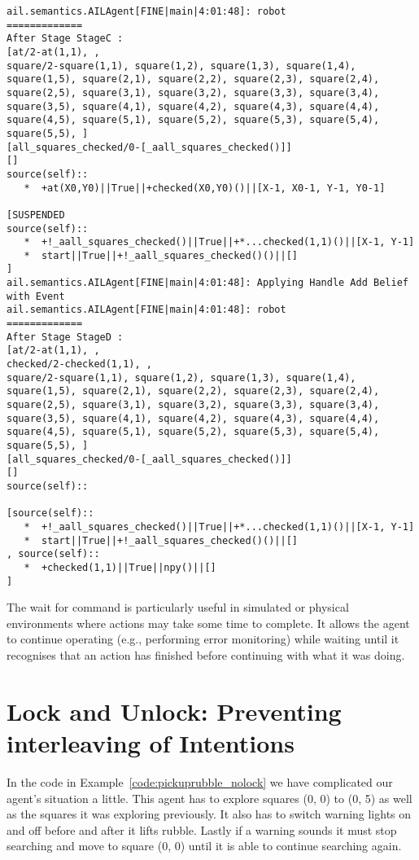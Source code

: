 \begin{verbatim}
ail.semantics.AILAgent[FINE|main|4:01:48]: robot
=============
After Stage StageC :
[at/2-at(1,1), , 
square/2-square(1,1), square(1,2), square(1,3), square(1,4), square(1,5), square(2,1), square(2,2), square(2,3), square(2,4), square(2,5), square(3,1), square(3,2), square(3,3), square(3,4), square(3,5), square(4,1), square(4,2), square(4,3), square(4,4), square(4,5), square(5,1), square(5,2), square(5,3), square(5,4), square(5,5), ]
[all_squares_checked/0-[_aall_squares_checked()]]
[]
source(self):: 
   *  +at(X0,Y0)||True||+checked(X0,Y0)()||[X-1, X0-1, Y-1, Y0-1]

[SUSPENDED
source(self):: 
   *  +!_aall_squares_checked()||True||+*...checked(1,1)()||[X-1, Y-1]
   *  start||True||+!_aall_squares_checked()()||[]
] 
ail.semantics.AILAgent[FINE|main|4:01:48]: Applying Handle Add Belief with Event 
ail.semantics.AILAgent[FINE|main|4:01:48]: robot
=============
After Stage StageD :
[at/2-at(1,1), , 
checked/2-checked(1,1), , 
square/2-square(1,1), square(1,2), square(1,3), square(1,4), square(1,5), square(2,1), square(2,2), square(2,3), square(2,4), square(2,5), square(3,1), square(3,2), square(3,3), square(3,4), square(3,5), square(4,1), square(4,2), square(4,3), square(4,4), square(4,5), square(5,1), square(5,2), square(5,3), square(5,4), square(5,5), ]
[all_squares_checked/0-[_aall_squares_checked()]]
[]
source(self):: 

[source(self):: 
   *  +!_aall_squares_checked()||True||+*...checked(1,1)()||[X-1, Y-1]
   *  start||True||+!_aall_squares_checked()()||[]
, source(self):: 
   *  +checked(1,1)||True||npy()||[]
] 
\end{verbatim}

The wait for command is particularly useful in simulated or physical
environments where actions may take some time to complete.  It allows
the agent to continue operating (e.g., performing error monitoring)
while waiting until it recognises that an action has finished before
continuing with what it was
doing. 


\section{Lock and Unlock: Preventing interleaving of Intentions}
In the code in Example~\ref{code:pickuprubble_nolock} we have
complicated our agent's situation a little.  This agent has to explore
squares (0, 0) to (0, 5) as well as the squares it was exploring
previously.  It also has to switch warning lights on and off before
and after it lifts rubble.  Lastly if a warning sounds it must stop
searching and move to square (0, 0) until it is able to continue
searching again. 

